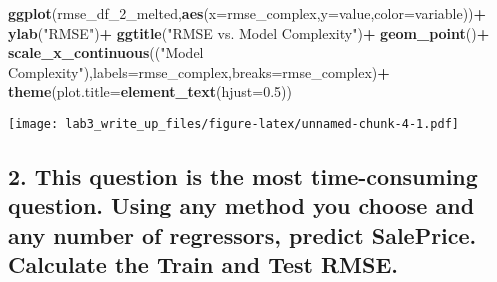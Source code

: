 \documentclass[]{article}
\newenvironment{Shaded}{\begin{snugshade}}{\end{snugshade}}
\newcommand{\DataTypeTok}[1]{\textcolor[rgb]{0.13,0.29,0.53}{#1}}
\newcommand{\DecValTok}[1]{\textcolor[rgb]{0.00,0.00,0.81}{#1}}
\newcommand{\FloatTok}[1]{\textcolor[rgb]{0.00,0.00,0.81}{#1}}
\newcommand{\KeywordTok}[1]{\textcolor[rgb]{0.13,0.29,0.53}{\textbf{#1}}}
\newcommand{\NormalTok}[1]{#1}
\newcommand{\OperatorTok}[1]{\textcolor[rgb]{0.81,0.36,0.00}{\textbf{#1}}}
\newcommand{\StringTok}[1]{\textcolor[rgb]{0.31,0.60,0.02}{#1}}
\begin{document}
\begin{Shaded}
\begin{Highlighting}[]
\KeywordTok{ggplot}\NormalTok{(rmse_df_}\DecValTok{2}\NormalTok{_melted,}\KeywordTok{aes}\NormalTok{(}\DataTypeTok{x=}\NormalTok{rmse_complex,}\DataTypeTok{y=}\NormalTok{value,}\DataTypeTok{color=}\NormalTok{variable))}\OperatorTok{+}
\StringTok{  }\KeywordTok{ylab}\NormalTok{(}\StringTok{"RMSE"}\NormalTok{)}\OperatorTok{+}
\StringTok{  }\KeywordTok{ggtitle}\NormalTok{(}\StringTok{"RMSE vs. Model Complexity"}\NormalTok{)}\OperatorTok{+}
\StringTok{  }\KeywordTok{geom_point}\NormalTok{()}\OperatorTok{+}
\StringTok{  }\KeywordTok{scale_x_continuous}\NormalTok{((}\StringTok{"Model Complexity"}\NormalTok{),}\DataTypeTok{labels=}\NormalTok{rmse_complex,}\DataTypeTok{breaks=}\NormalTok{rmse_complex)}\OperatorTok{+}
\StringTok{  }\KeywordTok{theme}\NormalTok{(}\DataTypeTok{plot.title=}\KeywordTok{element_text}\NormalTok{(}\DataTypeTok{hjust=}\FloatTok{0.5}\NormalTok{))}
\end{Highlighting}
\end{Shaded}

\texttt{[image: lab3\_write\_up\_files/figure-latex/unnamed-chunk-4-1.pdf]}

\hypertarget{this-question-is-the-most-time-consuming-question.-using-any-method-you-choose-and-any-number-of-regressors-predict-saleprice.-calculate-the-train-and-test-rmse.}{%
\subsection{2. This question is the most time-consuming question. Using
any method you choose and any number of regressors, predict SalePrice.
Calculate the Train and Test
RMSE.}\label{this-question-is-the-most-time-consuming-question.-using-any-method-you-choose-and-any-number-of-regressors-predict-saleprice.-calculate-the-train-and-test-rmse.}}
\end{document}
